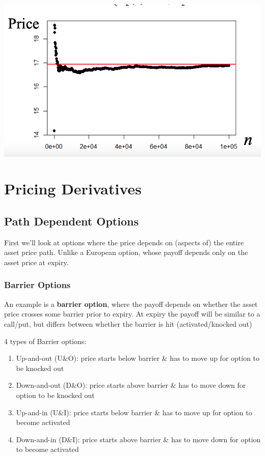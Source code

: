 \documentclass[
  oneside]{book}
\providecommand{\tightlist}{%
  \setlength{\itemsep}{0pt}\setlength{\parskip}{0pt}}
\begin{document}
\includegraphics{Notes/Obsidian-Attachments/10-Simulation-2.png}

\hypertarget{pricing-derivatives}{%
\chapter{Pricing Derivatives}\label{pricing-derivatives}}

\hypertarget{path-dependent-options}{%
\section{Path Dependent Options}\label{path-dependent-options}}

First we'll look at options where the price depends on (aspects of) the entire asset price path. Unlike a European option, whose payoff depends only on the asset price at expiry.

\hypertarget{barrier-options}{%
\subsection{Barrier Options}\label{barrier-options}}

An example is a \textbf{barrier option}, where the payoff depends on whether the asset price crosses some barrier prior to expiry. At expiry the payoff will be similar to a call/put, but differs between whether the barrier is hit (activated/knocked out)

4 types of Barrier options:

\begin{enumerate}
\def\labelenumi{\arabic{enumi}.}
\tightlist
\item
  Up-and-out (U\&O): price starts below barrier \& has to move up for option to be knocked out
\item
  Down-and-out (D\&O): price starts above barrier \& has to move down for option to be knocked out
\item
  Up-and-in (U\&I): price starts below barrier \& has to move up for option to become activated
\item
  Down-and-in (D\&I): price starts above barrier \& has to move down for option to become activated
\end{enumerate}
\end{document}
